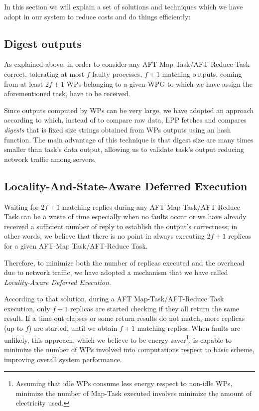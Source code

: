 \documentclass[sigchi]{acmart}
\begin{document}
In this section we will explain a set of solutions and techniques which we have adopt in our system to reduce costs and do things efficiently:

\subsection{Digest outputs} As explained above, in order to consider any AFT-Map Task/AFT-Reduce Task correct, tolerating at most $f$ faulty processes, $f + 1$ matching outputs, coming from at least $2f + 1$ WPs belonging to a given WPG to which we have assign the aforementioned task, have to be received. 

Since outputs computed by WPs can be very large, we have adopted an approach according to which, instead of to compare raw data, LPP fetches and compares \textit{digests} that is fixed size strings obtained from WPs outputs using an hash function. The main advantage of this technique is that digest size are many times smaller than task's data output, allowing us to validate task's output reducing network traffic among servers.

\subsection{Locality-And-State-Aware Deferred Execution} 

Waiting for $2f + 1$ matching replies during any AFT Map-Task/AFT-Reduce Task can be a waste of time especially when no faults occur or we have already received a sufficient number of reply to establish the output's correctness; in other words, we believe that there is no point in always executing $2f + 1$ replicas for a given AFT-Map Task/AFT-Reduce Task.

Therefore, to minimize both the number of replicas executed and the overhead due to network traffic, we have adopted a mechanism that we have called \textit{Locality-Aware Deferred Execution}. 

According to that solution, during a AFT Map-Task/AFT-Reduce Task execution, only $f + 1$ replicas are started checking if they all return the same result. If a time-out elapses or some return results do not match, more replicas (up to $f$) are started, until we obtain $f + 1$ matching replies. When faults are unlikely, this approach, which we believe to be energy-saver\footnote{Assuming that idle WPs consume less energy respect to non-idle WPs, minimize the number of Map-Task executed involves minimize the amount of electricity used.}, is capable to minimize the number of WPs involved into computations respect to basic scheme, improving overall system performance.
\end{document}

